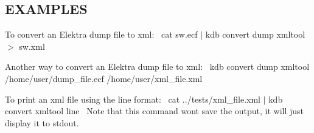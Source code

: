 \subsection*{E\+X\+A\+M\+P\+L\+ES}

To convert an Elektra dump file to xml\+:~\newline
 {\ttfamily cat sw.\+ecf $\vert$ kdb convert dump xmltool $>$ sw.\+xml}

Another way to convert an Elektra dump file to xml\+:~\newline
 {\ttfamily kdb convert dump xmltool /home/user/dump\+\_\+file.ecf /home/user/xml\+\_\+file.xml}

To print an xml file using the {\ttfamily line} format\+:~\newline
 {\ttfamily cat ../tests/xml\+\_\+file.xml $\vert$ kdb convert xmltool line}~\newline
 Note that this command won\textquotesingle{}t save the output, it will just display it to {\ttfamily stdout}. 